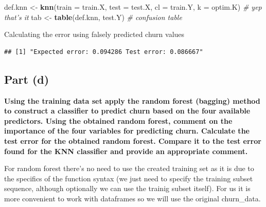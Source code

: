 \documentclass[
]{article}
\newenvironment{Shaded}{\begin{snugshade}}{\end{snugshade}}
\newcommand{\CommentTok}[1]{\textcolor[rgb]{0.56,0.35,0.01}{\textit{#1}}}
\newcommand{\DataTypeTok}[1]{\textcolor[rgb]{0.13,0.29,0.53}{#1}}
\newcommand{\DecValTok}[1]{\textcolor[rgb]{0.00,0.00,0.81}{#1}}
\newcommand{\KeywordTok}[1]{\textcolor[rgb]{0.13,0.29,0.53}{\textbf{#1}}}
\newcommand{\NormalTok}[1]{#1}
\newcommand{\OperatorTok}[1]{\textcolor[rgb]{0.81,0.36,0.00}{\textbf{#1}}}
\newcommand{\StringTok}[1]{\textcolor[rgb]{0.31,0.60,0.02}{#1}}
\begin{document}
\begin{Shaded}
\begin{Highlighting}[]
\NormalTok{def.knn <-}\StringTok{ }\KeywordTok{knn}\NormalTok{(}\DataTypeTok{train =}\NormalTok{ train.X, }\DataTypeTok{test =}\NormalTok{ test.X, }\DataTypeTok{cl =}\NormalTok{ train.Y, }\DataTypeTok{k =}\NormalTok{ optim.K) }\CommentTok{# yep that's it}
\NormalTok{tab <-}\StringTok{ }\KeywordTok{table}\NormalTok{(def.knn, test.Y) }\CommentTok{# confusion table}
\end{Highlighting}
\end{Shaded}

Calculating the error using falsely predicted churn values

\begin{Shaded}
\end{Shaded}

\begin{verbatim}
## [1] "Expected error: 0.094286 Test error: 0.086667"
\end{verbatim}

\hypertarget{part-d}{%
\subsection{\texorpdfstring{\textbf{Part (d)}}{Part (d)}}\label{part-d}}

\textbf{Using the training data set apply the random forest (bagging)
method to construct a classifier to predict churn based on the four
available predictors. Using the obtained random forest, comment on the
importance of the four variables for predicting churn. Calculate the
test error for the obtained random forest. Compare it to the test error
found for the KNN classifier and provide an appropriate comment.}

For random forest there's no need to use the created training set as it
is due to the specifics of the function syntax (we just need to specify
the training subset sequence, although optionally we can use the trainig
subset itself). For us it is more convenient to work with dataframes so
we will use the original churn\_data.
\end{document}
